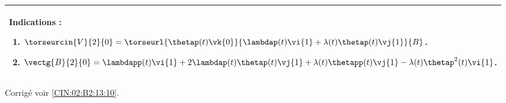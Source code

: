 \else
\fi


\ifprof
\else
\footnotesize
\ifcolle
\else
\begin{marginfigure}
\begin{tabular}{|p{.9\linewidth}|}
\hline
Indications :
\begin{enumerate}
\item $\torseurcin{V}{2}{0} = \torseurl{\thetap(t)\vk{0}}{\lambdap(t) \vi{1}+\lambda(t)\thetap(t)\vj{1}}{B}$.
\item $\vectg{B}{2}{0} = \lambdapp(t) \vi{1}+2 \lambdap(t) \thetap(t) \vj{1}+\lambda(t)\thetapp(t)\vj{1}-\lambda(t)\thetap^2(t)\vi{1} $.
\end{enumerate} \\ \hline
\end{tabular}
\end{marginfigure}
\fi

\normalsize
\begin{flushright}
\footnotesize{Corrigé  voir \ref{CIN:02:B2:13:10}.}
\end{flushright}%
\fi